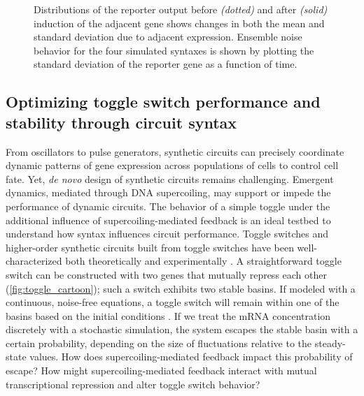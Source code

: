 \documentclass[11pt]{article}
\begin{document}
\begin{figure}[htbp]
{         Distributions of the reporter output before \textit{(dotted)} and after \textit{(solid)} induction of the adjacent gene shows changes in both the mean and standard deviation due to adjacent expression.
         Ensemble noise behavior for the four simulated syntaxes is shown by plotting the standard deviation of the reporter gene as a function of time.
    }
    \label{fig:top:single_cell_noise_correlation}
\end{figure}

\FloatBarrier
\subsection{Optimizing toggle switch performance and stability through circuit syntax}
From oscillators to pulse generators, synthetic circuits can  precisely coordinate dynamic patterns of gene expression across populations of cells to control cell fate. Yet, \textit{de novo}
design of synthetic circuits remains challenging. Emergent dynamics, mediated through DNA supercoiling, may support or impede the performance of dynamic circuits. The behavior of a simple toggle under the additional influence of supercoiling-mediated feedback is an ideal testbed to understand how syntax influences circuit performance.
Toggle switches and higher-order synthetic circuits built from toggle switches have been well-characterized both theoretically \parencite{gardnerConstructionGeneticToggle2000} and experimentally \parencite{yeungBiophysicalConstraintsArising2017,zhuSyntheticMultistabilityMammalian2021}.
A straightforward toggle switch can be constructed with two genes that mutually repress each other (\cref{fig:toggle_cartoon}); such a switch exhibits two stable basins. If modeled with a continuous, noise-free equations, a toggle switch will remain within one of the basins based on the initial conditions \parencite{gardnerConstructionGeneticToggle2000}. If  we treat the mRNA concentration discretely with a stochastic simulation, the system escapes the stable basin with a certain probability, depending on the size of fluctuations relative to the steady-state values. How does supercoiling-mediated feedback impact this probability of escape? How might supercoiling-mediated feedback interact with mutual transcriptional repression and alter toggle switch behavior?
\end{document}
